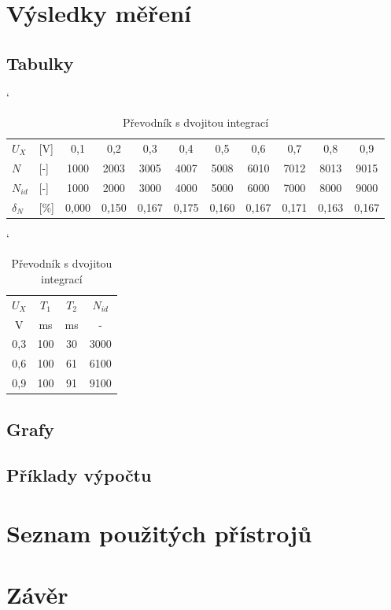 \documentclass[a4paper, czech]{article}
\begin{document}
\section{Výsledky měření}

\subsection{Tabulky}

\begin{table}[H]
    \catcode`
    \centering
    \caption{Převodník s dvojitou integrací}
    \begin{tabular}{ll|ccccccccc}
        \toprule
        $U_X$  & [V]  & 0,1   & 0,2   & 0,3   & 0,4   & 0,5   & 0,6   & 0,7   & 0,8   & 0,9   \\
        \cmidrule(rl){1-11}
        $N$   & [-]  & 1000  & 2003  & 3005  & 4007  & 5008  & 6010  & 7012  & 8013  & 9015  \\
        $N_{id}$ & [-]  & 1000  & 2000  & 3000  & 4000  & 5000  & 6000  & 7000  & 8000  & 9000  \\
        $\delta_N$  & [\%] & 0,000 & 0,150 & 0,167 & 0,175 & 0,160 & 0,167 & 0,171 & 0,163 & 0,167 \\
        \bottomrule
    \end{tabular}
\end{table}

\begin{table}[H]
    \catcode`
    \centering
    \caption{Převodník s dvojitou integrací}
    \begin{tabular}{cccc}
        \toprule
        $U_X$  & $T_1$  & $T_2$ & $N_{id}$  \\
        \cmidrule(rl){1-1}
        \cmidrule(rl){2-2}
        \cmidrule(rl){3-3}
        \cmidrule(rl){4-4}
        V   & ms  & ms & -    \\
        \midrule
        0,3 & 100 & 30 & 3000 \\
        0,6 & 100 & 61 & 6100 \\
        0,9 & 100 & 91 & 9100 \\
        \bottomrule
    \end{tabular}
\end{table}

\subsection{Grafy}

\subsection{Příklady výpočtu}

\section{Seznam použitých přístrojů}

\section{Závěr}
\end{document}
